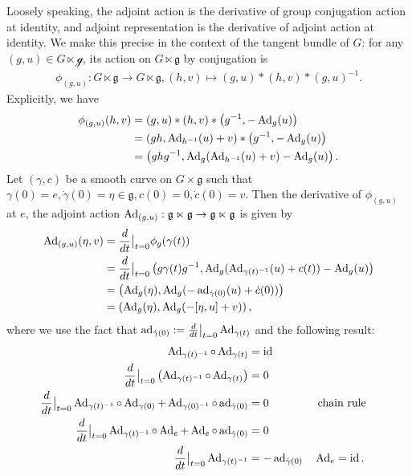 \documentclass[12pt,class=article,crop=false]{standalone}
\begin{document}
Loosely speaking, the adjoint action is the derivative of group conjugation action at identity, and adjoint representation is the derivative of adjoint action at identity. We make this precise in the context of the tangent bundle of $ G$: for any $ (g,u) \in G \ltimes \mathcal{ g}$, its action on $ G \ltimes \mathfrak{g} $ by conjugation is
\begin{align*}
	\phi_{(g,u)} : G \ltimes \mathfrak{g}  \to G \ltimes \mathfrak{g} , (h,v) \mapsto (g,u)*(h,v)*(g,u)^{-1}.
\end{align*}
Explicitly, we have
\begin{align*}
	\phi_{(g,u)} (h,v) &= (g,u)*(h,v)*\left( g^{-1}, - \operatorname{Ad}_{ g}( u) \right)  \\
	&= (gh, \operatorname{Ad}_{ h^{-1}}( u) + v) * \left( g^{-1}, - \operatorname{Ad}_{ g}( u) \right)  \\
	&= \left( ghg^{-1}, \operatorname{Ad}_{ g}( \operatorname{Ad}_{ h^{-1}}( u) + v) - \operatorname{Ad}_{ g}( u) \right)  .
\end{align*}
Let $ (\gamma, c)$ be a smooth curve on $ G \times  \mathfrak{g} $ such that $ \gamma(0) = e, \dot{ \gamma}(0) = \eta \in \mathfrak{g}, c(0) = 0, \dot{c}(0) = v$. Then the derivative of $ \phi_{(g,u)}$ at $ e$, the adjoint action $ \operatorname{Ad}_{(g,u)} : \mathfrak{g} \ltimes \mathfrak{g}  \to \mathfrak{g}\ltimes \mathfrak{g} $ is given by
 \begin{align*}
	 \operatorname{Ad}_{ (g,u)}(\eta, v ) &= \frac{d}{dt}\big|_{t= 0} \phi_g ( \gamma(t)) \\
				&= \frac{d}{dt}\big|_{t= 0} \left( g \gamma(t) g^{-1}, \operatorname{Ad}_{ g}( \operatorname{Ad}_{ \gamma(t)^{-1}}( u) + c(t)) - \operatorname{Ad}_{ g}( u) \right)  \\ 
						     &= \left( \operatorname{Ad}_{ g}( \eta), \operatorname{Ad}_{ g}(- \operatorname{ad}_{\dot{ \gamma}(0)} (u) + \dot{c}(0) ) \right)  \\
						     &= \left( \operatorname{Ad}_{ g}( \eta), \operatorname{Ad}_{ g}( -[ \eta, u] + v) \right)  ,
\end{align*}
where we use the fact that $ \operatorname{ad}_{ \dot{ \gamma}(0)} := \frac{d}{dt}\big|_{t= 0} \operatorname{Ad}_{ \gamma(t)}$ and the following result: 
\begin{align*}
\operatorname{Ad}_{ \gamma(t)^{-1}} \circ  \operatorname{Ad}_{ \gamma(t)} &= \operatorname{id}  \\
\frac{d}{dt}\big|_{t= 0} \left( \operatorname{Ad}_{ \gamma(t)^{-1}} \circ  \operatorname{Ad}_{ \gamma(t)} \right) &= 0 \\
\frac{d}{dt}\big|_{t= 0} \operatorname{Ad}_{ \gamma(t)^{-1}} \circ  \operatorname{Ad}_{ \gamma(0)} + \operatorname{Ad}_{ \gamma(0)^{-1}} \circ \operatorname{ad}_{ \dot{ \gamma}(0)} &= 0 && \text{ chain rule}\\
\frac{d}{dt}\big|_{t= 0} \operatorname{Ad}_{ \gamma(t)^{-1}} \circ \operatorname{Ad}_{ e} + \operatorname{Ad}_{ e} \circ \operatorname{ad}_{\dot{ \gamma}(0)} &= 0 \\
\frac{d}{dt}\big|_{t= 0} \operatorname{Ad}_{ \gamma(t)^{-1}} &= - \operatorname{ad}_{ \dot{ \gamma}(0)}  && \operatorname{Ad}_{ e} = \operatorname{id}  . 
\end{align*}
\end{document}
